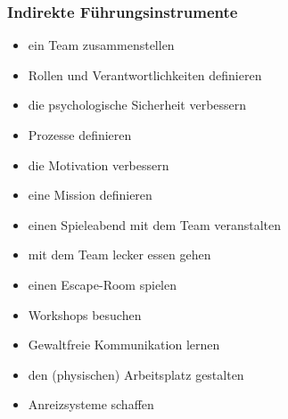 \subsubsection{Indirekte Führungsinstrumente}

\begin{itemize}
  \item ein Team zusammenstellen
  \item Rollen und Verantwortlichkeiten definieren
  \item die psychologische Sicherheit verbessern
  \item Prozesse definieren
  \item die Motivation verbessern
  \item eine Mission definieren
  \item einen Spieleabend mit dem Team veranstalten
  \item mit dem Team lecker essen gehen
  \item einen Escape-Room spielen
  \item Workshops besuchen
  \item Gewaltfreie Kommunikation lernen
  \item den (physischen) Arbeitsplatz gestalten
  \item Anreizsysteme schaffen
\end{itemize}
